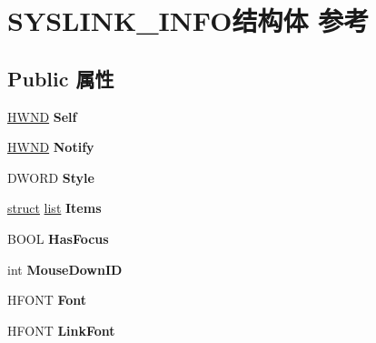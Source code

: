\hypertarget{struct_s_y_s_l_i_n_k___i_n_f_o}{}\section{S\+Y\+S\+L\+I\+N\+K\+\_\+\+I\+N\+F\+O结构体 参考}
\label{struct_s_y_s_l_i_n_k___i_n_f_o}
\subsection*{Public 属性}
\begin{DoxyCompactItemize}
\item 
\mbox{\label{struct_s_y_s_l_i_n_k___i_n_f_o_a984f248152d828033ac7bc7ad5a6e918}} 
\hyperlink{interfacevoid}{H\+W\+ND} {\bfseries Self}
\item 
\mbox{\label{struct_s_y_s_l_i_n_k___i_n_f_o_a404bb02f4c08548ce5c2b6774e45aa2b}} 
\hyperlink{interfacevoid}{H\+W\+ND} {\bfseries Notify}
\item 
\mbox{\label{struct_s_y_s_l_i_n_k___i_n_f_o_a9305fba207e7bfec2c3163c73f8f7809}} 
D\+W\+O\+RD {\bfseries Style}
\item 
\mbox{\label{struct_s_y_s_l_i_n_k___i_n_f_o_ae9b6a5b24062e7e34060657f0a1725e3}} 
\hyperlink{interfacestruct}{struct} \hyperlink{classlist}{list} {\bfseries Items}
\item 
\mbox{\label{struct_s_y_s_l_i_n_k___i_n_f_o_a6d6b34727e7a037ce30abe6978873832}} 
B\+O\+OL {\bfseries Has\+Focus}
\item 
\mbox{\label{struct_s_y_s_l_i_n_k___i_n_f_o_a7d263084ae0fe6a0d0548b78c173801f}} 
int {\bfseries Mouse\+Down\+ID}
\item 
\mbox{\label{struct_s_y_s_l_i_n_k___i_n_f_o_a6d6e47d7bb86ba91fde1d8d72ec0d19f}} 
H\+F\+O\+NT {\bfseries Font}
\item 
\mbox{\label{struct_s_y_s_l_i_n_k___i_n_f_o_a99d80f2474ca29b5018a8ce54c781370}} 
H\+F\+O\+NT {\bfseries Link\+Font}

\end{DoxyCompactItemize}

